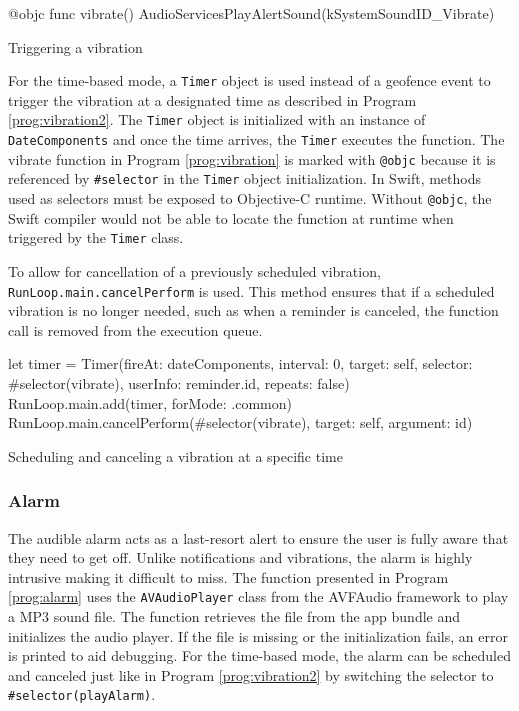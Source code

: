 \begin{program}[htbp]
\begin{SwiftCode}
@objc func vibrate() {
    AudioServicesPlayAlertSound(kSystemSoundID_Vibrate)
}\end{SwiftCode}
\caption{Triggering a vibration}
\label{prog:vibration}
\end{program}

For the time-based mode, a \lstinline{Timer} object is used instead of a geofence event to trigger the vibration at a designated time as described in Program \ref{prog:vibration2}. 
The \lstinline{Timer} object is initialized with an instance of \lstinline{DateComponents} and once the time arrives, the \lstinline{Timer} executes the function.
The vibrate function in Program \ref{prog:vibration} is marked with \texttt{@objc} because it is referenced by \texttt{\#selector} in the \lstinline{Timer} object initialization. 
In Swift, methods used as selectors must be exposed to Objective-C runtime. 
Without \texttt{@objc}, the Swift compiler would not be able to locate the function at runtime when triggered by the \lstinline{Timer} class.

To allow for cancellation of a previously scheduled vibration, \lstinline{RunLoop.main.cancelPerform} is used. 
This method ensures that if a scheduled vibration is no longer needed, such as when a reminder is canceled, the function call is removed from the execution queue.

\begin{program}[htbp]
\begin{SwiftCode}
let timer = Timer(fireAt: dateComponents, interval: 0, target: self, selector: #selector(vibrate), userInfo: reminder.id, repeats: false)
RunLoop.main.add(timer, forMode: .common)
RunLoop.main.cancelPerform(#selector(vibrate), target: self, argument: id)\end{SwiftCode}
\caption{Scheduling and canceling a vibration at a specific time}
\label{prog:vibration2}
\end{program}

\subsubsection{Alarm}
The audible alarm acts as a last-resort alert to ensure the user is fully aware that they need to get off.
Unlike notifications and vibrations, the alarm is highly intrusive making it difficult to miss.
The function presented in Program \ref{prog:alarm} uses the \lstinline{AVAudioPlayer} class from the AVFAudio framework to play a MP3 sound file. 
The function retrieves the file from the app bundle and initializes the audio player. 
If the file is missing or the initialization fails, an error is printed to aid debugging.
For the time-based mode, the alarm can be scheduled and canceled just like in Program \ref{prog:vibration2} by switching the selector to \texttt{\#selector(playAlarm)}.

